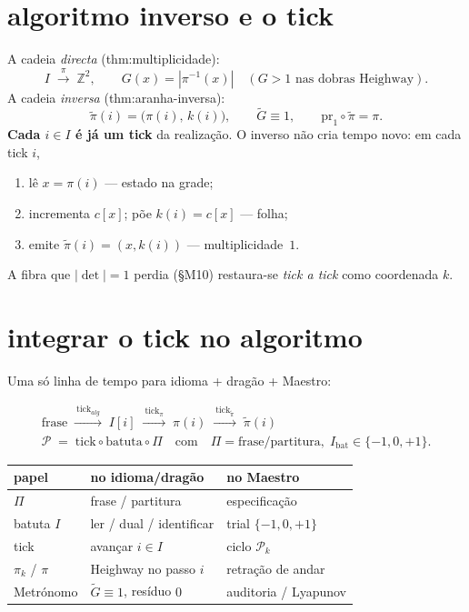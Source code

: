 \documentclass[11pt,a4paper]{article}
\begin{document}
\section{algoritmo inverso e o tick}\label{sec:tick-inverso}
A cadeia \emph{directa} (thm:multiplicidade):
\[
I \;\xrightarrow{\ \pi\ }\; \mathbb{Z}^{2},\qquad
G(x)=|\pi^{-1}(x)|
\quad(G>1\text{ nas dobras Heighway}).
\]
A cadeia \emph{inversa} (thm:aranha-inversa):
\[
\tilde\pi(i)=\bigl(\pi(i),\,k(i)\bigr),\qquad
\tilde G\equiv1,\qquad
\mathrm{pr}_{1}\circ\tilde\pi=\pi.
\]
\textbf{Cada $i\in I$ é já um tick} da realização. O inverso não cria
tempo novo: em cada tick $i$,
\begin{enumerate}\itemsep2pt
\item lê $x=\pi(i)$ --- estado na grade;
\item incrementa $c[x]$; põe $k(i)=c[x]$ --- folha;
\item emite $\tilde\pi(i)=(x,k(i))$ --- multiplicidade~$1$.
\end{enumerate}
A fibra que $|\det|=1$ perdia (§M10) restaura-se \emph{tick a tick}
como coordenada $k$.

\section{integrar o tick no algoritmo}\label{sec:tick-integra}
Uma só linha de tempo para idioma + dragão + Maestro:

\[
\boxed{\;
\begin{array}{c}
\text{frase}
\;\xrightarrow{\ \mathrm{tick}_{alg}\ }\;
I[i]
\;\xrightarrow{\ \mathrm{tick}_{\pi}\ }\;
\pi(i)
\;\xrightarrow{\ \mathrm{tick}_{\tilde\pi}\ }\;
\tilde\pi(i)
\\[0.6em]
\mathcal{P}
\;=\;
\mathrm{tick}\circ\mathrm{batuta}\circ\Pi
\quad\text{com}\quad
\Pi=\text{frase/partitura},\;
I_{\mathrm{bat}}\in\{-1,0,+1\}.
\end{array}
\;}
\]

\begin{center}\small
\begin{tabular}{@{}lll@{}}
\toprule
papel & no idioma/dragão & no Maestro \\
\midrule
$\Pi$ & frase / partitura & especificação \\
batuta $I$ & ler / dual / identificar & trial $\{-1,0,+1\}$ \\
tick & avançar $i\in I$ & ciclo $\mathcal{P}_k$ \\
$\pi_k$ / $\pi$ & Heighway no passo $i$ & retração de andar \\
Metrónomo & $\tilde G\equiv1$, resíduo $0$ & auditoria / Lyapunov \\
\bottomrule
\end{tabular}
\end{center}
\end{document}
